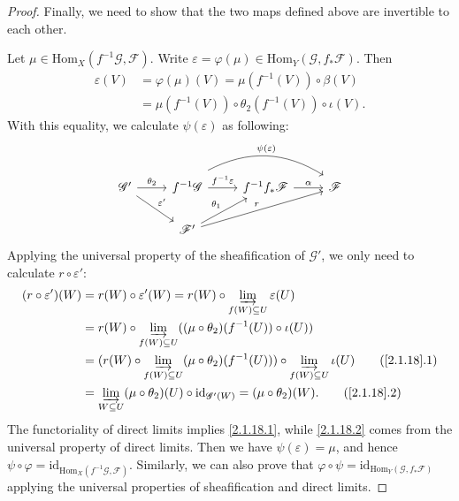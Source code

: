 \documentclass[12pt]{amsart}
\begin{document}
\begin{proof}
   Finally, we need to show that the two maps defined above are invertible to each other.
   
   Let $\mu\in\mathrm{Hom}_X(f^{-1}\mathscr{G},\mathscr{F})$. Write $\varepsilon=\varphi(\mu)\in\mathrm{Hom}_Y(\mathscr{G},f_*\mathscr{F})$. Then
   \begin{align*}
   \varepsilon(V)&=\varphi(\mu)(V)=\mu(f^{-1}(V))\circ\beta(V)\\
   &=\mu(f^{-1}(V))\circ\theta_2(f^{-1}(V))\circ\iota(V).
   \end{align*} 
   With this equality, we calculate $\psi(\varepsilon)$ as following:
   \begin{equation*}
   \begin{tikzcd}
   \mathscr{G}' \arrow[r, "\theta_2"] \arrow[rd, "\varepsilon'"] & f^{-1}\mathscr{G} \arrow[r, "f^{-1}\varepsilon"] \arrow[rr, "\psi(\varepsilon)", bend left, shift left=2] & f^{-1}f_*\mathscr{F} \arrow[r, "\alpha"] & \mathscr{F} \\
   & \mathscr{F}' \arrow[ru, "\theta_1"] \arrow[rru, "r"]                                                      &                                          &            
   \end{tikzcd}
   \end{equation*}
   Applying the universal property of the sheafification of $\mathscr{G}'$, we only need to calculate $r\circ\varepsilon'$:
   \begin{align}
    (r\circ\varepsilon')(W)&=r(W)\circ\varepsilon'(W)=r(W)\circ\varinjlim_{f(W) \subseteq U}\varepsilon(U)\notag\\
    &=r(W)\circ\varinjlim_{f(W) \subseteq U}((\mu\circ\theta_2)(f^{-1}(U))\circ\iota(U))\notag\\
    &=(r(W)\circ\varinjlim_{f(W) \subseteq U}(\mu\circ\theta_2)(f^{-1}(U)))\circ\varinjlim_{f(W) \subseteq U}\iota(U)\tag{\ref*{2.1.18}.1}\label{2.1.18.1}\\
    &=\varinjlim_{W \subseteq U}(\mu\circ\theta_2)(U)\circ\mathrm{id}_{\mathscr{G}'(W)}=(\mu\circ\theta_2)(W).\tag{\ref*{2.1.18}.2}\label{2.1.18.2}
    \end{align}
    The functoriality of direct limits implies \eqref{2.1.18.1}, while \eqref{2.1.18.2} comes from the universal property of direct limits. Then we have $\psi(\varepsilon)=\mu$, and hence $\psi\circ\varphi=\mathrm{id}_{\mathrm{Hom}_X(f^{-1}\mathscr{G},\mathscr{F})}$. Similarly, we can also prove that $\varphi\circ\psi=\mathrm{id}_{\mathrm{Hom}_{Y}(\mathscr{G}, f_{*}\mathscr{F})}$ applying the universal properties of sheafification and direct limits.
\end{proof}
\end{document}
